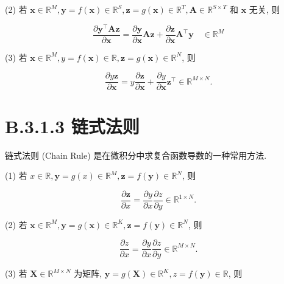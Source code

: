 \documentclass[10pt]{article}
\begin{document}
(2) 若 $\boldsymbol{x} \in \mathbb{R}^{M}, \boldsymbol{y}=f(\boldsymbol{x}) \in \mathbb{R}^{S}, \boldsymbol{z}=g(\boldsymbol{x}) \in \mathbb{R}^{T}, \boldsymbol{A} \in \mathbb{R}^{S \times T}$ 和 $\boldsymbol{x}$ 无关, 则


\begin{equation*}
\frac{\partial \boldsymbol{y}^{\top} \boldsymbol{A} \boldsymbol{z}}{\partial \boldsymbol{x}}=\frac{\partial \boldsymbol{y}}{\partial \boldsymbol{x}} \boldsymbol{A z}+\frac{\partial \boldsymbol{z}}{\partial \boldsymbol{x}} \boldsymbol{A}^{\top} \boldsymbol{y} \quad \in \mathbb{R}^{M} \tag{B.14}
\end{equation*}


(3) 若 $\boldsymbol{x} \in \mathbb{R}^{M}, y=f(\boldsymbol{x}) \in \mathbb{R}, \boldsymbol{z}=g(\boldsymbol{x}) \in \mathbb{R}^{N}$, 则


\begin{equation*}
\frac{\partial y \boldsymbol{z}}{\partial \boldsymbol{x}}=y \frac{\partial \boldsymbol{z}}{\partial \boldsymbol{x}}+\frac{\partial y}{\partial \boldsymbol{x}} \boldsymbol{z}^{\top} \in \mathbb{R}^{M \times N} . \tag{B.15}
\end{equation*}


\section*{B.3.1.3 链式法则}
链式法则 (Chain Rule) 是在微积分中求复合函数导数的一种常用方法.

(1) 若 $x \in \mathbb{R}, \boldsymbol{y}=g(x) \in \mathbb{R}^{M}, \boldsymbol{z}=f(\boldsymbol{y}) \in \mathbb{R}^{N}$, 则


\begin{equation*}
\frac{\partial \boldsymbol{z}}{\partial x}=\frac{\partial y}{\partial x} \frac{\partial z}{\partial y} \in \mathbb{R}^{1 \times N} . \tag{B.16}
\end{equation*}


(2) 若 $\boldsymbol{x} \in \mathbb{R}^{M}, \boldsymbol{y}=g(\boldsymbol{x}) \in \mathbb{R}^{K}, \boldsymbol{z}=f(\boldsymbol{y}) \in \mathbb{R}^{N}$, 则


\begin{equation*}
\frac{\partial z}{\partial x}=\frac{\partial y}{\partial x} \frac{\partial z}{\partial y} \in \mathbb{R}^{M \times N} . \tag{B.17}
\end{equation*}


(3) 若 $\boldsymbol{X} \in \mathbb{R}^{M \times N}$ 为矩阵, $\boldsymbol{y}=g(\boldsymbol{X}) \in \mathbb{R}^{K}, z=f(\boldsymbol{y}) \in \mathbb{R}$, 则
\end{document}
